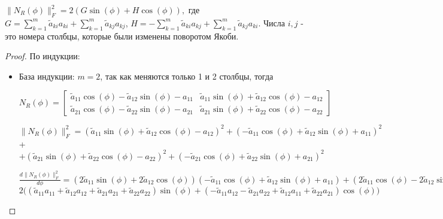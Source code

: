 \begin{claim}
    $\|N_R(\phi) \|_F^2 = 2(G\sin(\phi) + H\cos(\phi)),$ где $G = \sum_{k = 1}^m \tilde{a}_{ki}a_{ki} + \sum_{k = 1}^m\tilde{a}_{kj}a_{kj}$, $ H = -\sum_{k = 1}^m\tilde{a}_{ki}a_{kj} + \sum_{k = 1}^m\tilde{a}_{kj}a_{ki}$. Числа $i,j$ - это номера столбцы, которые были изменены поворотом Якоби. 
\end{claim}
\begin{proof} По индукции:
\begin{itemize}
    \item База индукции: $m = 2$, так как меняются только 1 и 2 столбцы, тогда
    \begin{center}
        $N_{R}(\phi) = \left[\begin{matrix}\tilde{a}_{11} \cos{\left(\phi \right)} - \tilde{a}_{12} \sin{\left(\phi \right)} - {a}_{11} & \tilde{a}_{11} \sin{\left(\phi \right)} + \tilde{a}_{12} \cos{\left(\phi \right)} - {a}_{12}\\\tilde{a}_{21} \cos{\left(\phi \right)} - \tilde{a}_{22} \sin{\left(\phi \right)} - {a}_{21} & \tilde{a}_{21} \sin{\left(\phi \right)} + \tilde{a}_{22} \cos{\left(\phi \right)} - {a}_{22}\end{matrix}\right]$
    \end{center}
    \begin{center}
        $\|N_R(\phi) \|_F^2 = \left(\tilde{a}_{11} \sin{\left(\phi \right)} + \tilde{a}_{12} \cos{\left(\phi \right)} - {a}_{12}\right)^{2} + \left(- \tilde{a}_{11} \cos{\left(\phi \right)} + \tilde{a}_{12} \sin{\left(\phi \right)} + {a}_{11}\right)^{2}$+ \newline$+ \left(\tilde{a}_{21} \sin{\left(\phi \right)} + \tilde{a}_{22} \cos{\left(\phi \right)} - {a}_{22}\right)^{2} + \left(- \tilde{a}_{21} \cos{\left(\phi \right)} + \tilde{a}_{22} \sin{\left(\phi \right)} + {a}_{21}\right)^{2}$
    \end{center}
    \begin{center}
        $\frac{d\|N_R(\phi) \|_F^2}{d\phi} = \left(2 \tilde{a}_{11} \sin{\left(\phi \right)} + 2 \tilde{a}_{12} \cos{\left(\phi \right)}\right) \left(- \tilde{a}_{11} \cos{\left(\phi \right)} + \tilde{a}_{12} \sin{\left(\phi \right)} + {a}_{11}\right) + \left(2 \tilde{a}_{11} \cos{\left(\phi \right)} - 2 \tilde{a}_{12} \sin{\left(\phi \right)}\right) \left(\tilde{a}_{11} \sin{\left(\phi \right)} + \tilde{a}_{12} \cos{\left(\phi \right)} - {a}_{12}\right) + \left(2 \tilde{a}_{21} \sin{\left(\phi \right)} + 2 \tilde{a}_{22} \cos{\left(\phi \right)}\right) \left(- \tilde{a}_{21} \cos{\left(\phi \right)} + \tilde{a}_{22} \sin{\left(\phi \right)} + {a}_{21}\right) + \left(2 \tilde{a}_{21} \cos{\left(\phi \right)} - 2 \tilde{a}_{22} \sin{\left(\phi \right)}\right) \left(\tilde{a}_{21} \sin{\left(\phi \right)} + \tilde{a}_{22} \cos{\left(\phi \right)} - {a}_{22}\right) = $
        $2(\left(\tilde{a}_{11} {a}_{11} + \tilde{a}_{12} {a}_{12} + \tilde{a}_{21} {a}_{21} + \tilde{a}_{22} {a}_{22}\right) \sin{\left(\phi \right)} + \left(-\tilde{a}_{11} {a}_{12} - \tilde{a}_{21} {a}_{22} + \tilde{a}_{12} {a}_{11} +  \tilde{a}_{22} {a}_{21}\right) \cos{\left(\phi \right))}$
    \end{center}
    

\end{itemize}
\end{proof}
